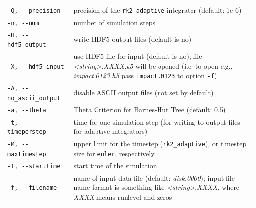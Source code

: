 \documentclass[10pt,fleqn,twoside]{article}
\begin{document}
\begin{table}
\begin{tabular}[b]{p{5cm} p{9cm}}
  \verb|-Q, --precision| & precision of the \verb|rk2_adaptive| integrator (default: 1e-6)                                                                                                                                      \\
  \verb|-n, --num| & number of simulation steps                                                                                                                                                                               \\
  \verb|-H, --hdf5_output| & write HDF5 output files (default is no)                                                                                                                                                                  \\
  \verb|-X, --hdf5_input| & use HDF5 file for input (default is no), file \emph{<string>.XXXX.h5} will be opened (i.e. to open e.g., \emph{impact.0123.h5} pass \verb|impact.0123| to option \verb|-f|)           \\
  \verb|-A, --no_ascii_output| & disable ASCII output files (not set by default)                                                                                                                                                          \\
  \verb|-a, --theta| & Theta Criterion for Barnes-Hut Tree (default: 0.5)                                                                                                                                                       \\
  \verb|-t, --timeperstep| & time for one simulation step (for writing to output files for adaptive integrators)                                                                                                                      \\
  \verb|-M, --maxtimestep| & upper limit for the timestep (\verb|rk2_adaptive|), or timestep size for \verb|euler|, respectively                                                                                       \\
  \verb|-T, --starttime| & start time of the simulation                                                                                                                                                                             \\
  \verb|-f, --filename| & name of input data file (default: \emph{disk.0000}); input file name format is something like \emph{<string>.XXXX}, where \emph{XXXX} means runlevel and zeros                                           \\

\end{tabular}
\end{table}
\end{document}
